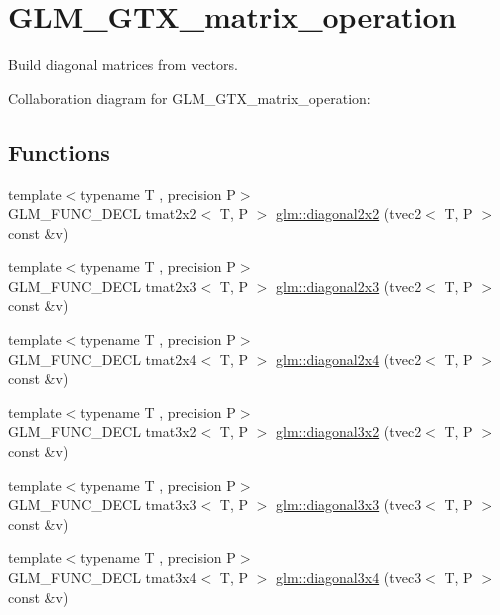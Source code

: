 \hypertarget{group__gtx__matrix__operation}{\section{G\-L\-M\-\_\-\-G\-T\-X\-\_\-matrix\-\_\-operation}
\label{group__gtx__matrix__operation}
}


Build diagonal matrices from vectors.  


Collaboration diagram for G\-L\-M\-\_\-\-G\-T\-X\-\_\-matrix\-\_\-operation\-:
\subsection*{Functions}
\begin{DoxyCompactItemize}
\item 
{\footnotesize template$<$typename T , precision P$>$ }\\G\-L\-M\-\_\-\-F\-U\-N\-C\-\_\-\-D\-E\-C\-L tmat2x2$<$ T, P $>$ \hyperlink{group__gtx__matrix__operation_ga01dc503262dba9c457113d131fc8c024}{glm\-::diagonal2x2} (tvec2$<$ T, P $>$ const \&v)
\item 
{\footnotesize template$<$typename T , precision P$>$ }\\G\-L\-M\-\_\-\-F\-U\-N\-C\-\_\-\-D\-E\-C\-L tmat2x3$<$ T, P $>$ \hyperlink{group__gtx__matrix__operation_ga763817f07d6a94b722a48adfa87a35db}{glm\-::diagonal2x3} (tvec2$<$ T, P $>$ const \&v)
\item 
{\footnotesize template$<$typename T , precision P$>$ }\\G\-L\-M\-\_\-\-F\-U\-N\-C\-\_\-\-D\-E\-C\-L tmat2x4$<$ T, P $>$ \hyperlink{group__gtx__matrix__operation_ga49b37c819cf6dd8e35112ed1a13d45a3}{glm\-::diagonal2x4} (tvec2$<$ T, P $>$ const \&v)
\item 
{\footnotesize template$<$typename T , precision P$>$ }\\G\-L\-M\-\_\-\-F\-U\-N\-C\-\_\-\-D\-E\-C\-L tmat3x2$<$ T, P $>$ \hyperlink{group__gtx__matrix__operation_ga586e1ced91fd8a7c414186a200f13532}{glm\-::diagonal3x2} (tvec2$<$ T, P $>$ const \&v)
\item 
{\footnotesize template$<$typename T , precision P$>$ }\\G\-L\-M\-\_\-\-F\-U\-N\-C\-\_\-\-D\-E\-C\-L tmat3x3$<$ T, P $>$ \hyperlink{group__gtx__matrix__operation_ga8e817dba22f2305cdebae07bbbe0360c}{glm\-::diagonal3x3} (tvec3$<$ T, P $>$ const \&v)
\item 
{\footnotesize template$<$typename T , precision P$>$ }\\G\-L\-M\-\_\-\-F\-U\-N\-C\-\_\-\-D\-E\-C\-L tmat3x4$<$ T, P $>$ \hyperlink{group__gtx__matrix__operation_gae3f85af86c18c80f2acbe3223feb8e81}{glm\-::diagonal3x4} (tvec3$<$ T, P $>$ const \&v)

\end{DoxyCompactItemize}
